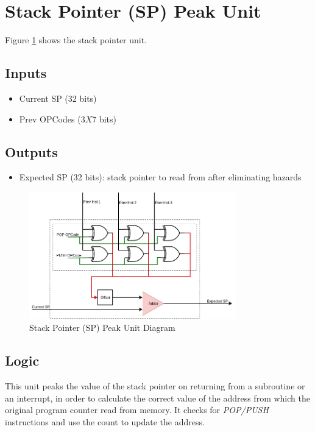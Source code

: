 \documentclass[12pt]{report}
\begin{document}
\section{Stack Pointer (SP) Peak Unit}
Figure \ref{fig:pspu} shows the stack pointer unit.

\subsection{Inputs}
\begin{itemize}
    \item Current SP (32 bits)
    \item Prev OPCodes (3$X$7 bits)
\end{itemize}

\subsection{Outputs}
\begin{itemize}
    \item Expected SP (32 bits): stack pointer to read from after eliminating hazards
\end{itemize}

\begin{center}
    \begin{figure}[hp]
        \centering
        \includegraphics[width=0.8\textwidth]{images/pspu}
        \caption{Stack Pointer (SP) Peak Unit Diagram}
        \label{fig:pspu}
    \end{figure}
\end{center}

\subsection{Logic}
This unit peaks the value of the stack pointer on returning from a subroutine or an interrupt, in order to calculate the correct value of the address from which the original program counter read from memory. It checks for \emph{POP/PUSH} instructions and use the count to update the address.
\end{document}
